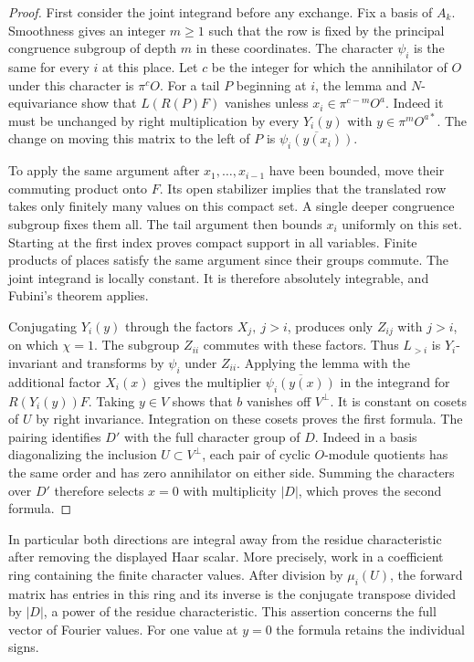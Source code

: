 \documentclass[a4paper,11pt]{article}
\theoremstyle{definition}
\theoremstyle{remark}
\numberwithin{equation}{section}
\begin{document}
\begin{proof}
First consider the joint integrand before any exchange. Fix a
basis of \(A_k\). Smoothness gives an integer \(m\ge1\) such
that the row is fixed by the principal congruence subgroup of
depth \(m\) in these coordinates. The character \(\psi_i\) is
the same for every \(i\) at this place. Let \(c\) be the integer
for which the annihilator of \(O\) under this character is \(\pi^cO\).
For a tail \(P\) beginning at \(i\), the lemma and
\(N\)-equivariance show that \(L(R(P)F)\) vanishes unless
\(x_i\in\pi^{c-m}O^a\). Indeed it must be unchanged by
right multiplication by every \(Y_i(y)\) with \(y\in\pi^mO^{a*}\).
The change on moving this matrix to the left of \(P\) is
\(\overline{\psi_i(y(x_i))}\).

To apply the same argument after \(x_1,\ldots,x_{i-1}\) have
been bounded, move their commuting product onto \(F\). Its open
stabilizer implies that the translated row takes only finitely
many values on this compact set. A single deeper
congruence subgroup fixes them all. The tail argument then
bounds \(x_i\) uniformly on this set. Starting at the first
index proves compact support in all variables. Finite products
of places satisfy the same argument since their groups commute.
The joint integrand is locally constant. It is therefore
absolutely integrable, and Fubini's theorem applies.

Conjugating \(Y_i(y)\) through the factors \(X_j,\ j>i\), produces
only \(Z_{ij}\) with \(j>i\), on which \(\chi=1\).
The subgroup \(Z_{ii}\) commutes with these factors. Thus
\(L_{>i}\) is \(Y_i\)-invariant and transforms by \(\psi_i\)
under \(Z_{ii}\). Applying the lemma with the additional factor
\(X_i(x)\) gives the multiplier \(\overline{\psi_i(y(x))}\)
in the integrand for \(R(Y_i(y))F\). Taking \(y\in V\) shows
that \(b\) vanishes off \(V^\perp\). It is constant on cosets of
\(U\) by right invariance. Integration on these cosets proves
the first formula. The pairing identifies \(D'\) with the full
character group of \(D\). Indeed in a basis diagonalizing the
inclusion \(U\subset V^\perp\), each pair of cyclic \(O\)-module
quotients has the same order and has zero annihilator on either
side. Summing the characters over \(D'\) therefore selects
\(x=0\) with multiplicity \(|D|\), which proves the second formula.
\end{proof}

In particular both directions are integral away from the residue
characteristic after removing the displayed Haar scalar. More
precisely, work in a coefficient ring containing the finite
character values. After division by \(\mu_i(U)\), the forward
matrix has entries in this ring and its inverse is the conjugate
transpose divided by \(|D|\), a power of the residue characteristic.
This assertion concerns the full vector of Fourier values. For
one value at \(y=0\) the formula retains the individual signs.
\end{document}
